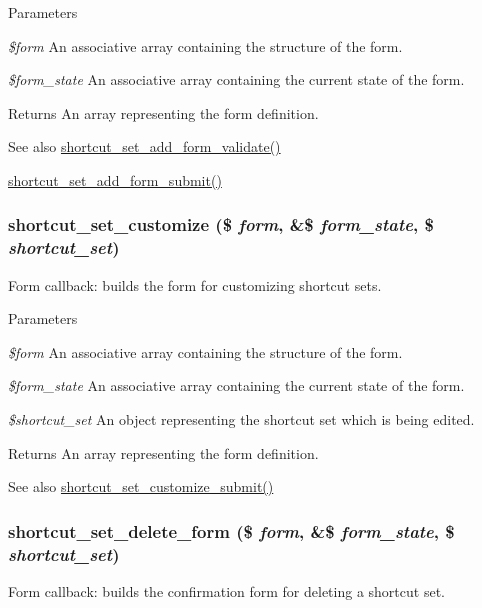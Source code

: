 \begin{DoxyParams}{Parameters}
\item[{\em \$form}]An associative array containing the structure of the form. \item[{\em \$form\_\-state}]An associative array containing the current state of the form.\end{DoxyParams}
\begin{DoxyReturn}{Returns}
An array representing the form definition.
\end{DoxyReturn}
\begin{DoxySeeAlso}{See also}
\hyperlink{shortcut_8admin_8inc_a7148e2c08e32e220522d92a113b63f0e}{shortcut\_\-set\_\-add\_\-form\_\-validate()} 

\hyperlink{shortcut_8admin_8inc_ad472e8cf443ae585c10ba86a12d7147b}{shortcut\_\-set\_\-add\_\-form\_\-submit()} 
\end{DoxySeeAlso}
\hypertarget{group__forms_ga6d25a8f35b26a475dc005c2cad4d902c}{
\subsubsection[{shortcut\_\-set\_\-customize}]{\setlength{\rightskip}{0pt plus 5cm}shortcut\_\-set\_\-customize (\$ {\em form}, \/  \&\$ {\em form\_\-state}, \/  \$ {\em shortcut\_\-set})}}
\label{group__forms_ga6d25a8f35b26a475dc005c2cad4d902c}
Form callback: builds the form for customizing shortcut sets.


\begin{DoxyParams}{Parameters}
\item[{\em \$form}]An associative array containing the structure of the form. \item[{\em \$form\_\-state}]An associative array containing the current state of the form. \item[{\em \$shortcut\_\-set}]An object representing the shortcut set which is being edited.\end{DoxyParams}
\begin{DoxyReturn}{Returns}
An array representing the form definition.
\end{DoxyReturn}
\begin{DoxySeeAlso}{See also}
\hyperlink{shortcut_8admin_8inc_a913f637b897f5261c040b4d66f9448ff}{shortcut\_\-set\_\-customize\_\-submit()} 
\end{DoxySeeAlso}
\hypertarget{group__forms_ga7a58c99b6b77af7fe9a0c954fa63f712}{
\subsubsection[{shortcut\_\-set\_\-delete\_\-form}]{\setlength{\rightskip}{0pt plus 5cm}shortcut\_\-set\_\-delete\_\-form (\$ {\em form}, \/  \&\$ {\em form\_\-state}, \/  \$ {\em shortcut\_\-set})}}
\label{group__forms_ga7a58c99b6b77af7fe9a0c954fa63f712}
Form callback: builds the confirmation form for deleting a shortcut set.


